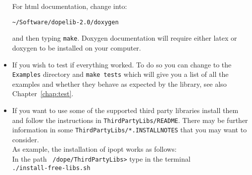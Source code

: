 \begin{itemize}
{\begin{lstlisting}
\end{lstlisting}
}
For html documentation, change into:
\begin{lstlisting}
~/Software/dopelib-2.0/doxygen
\end{lstlisting}
and then typing \texttt{make}. Doxygen documentation
will require either 
latex or doxygen to be installed on your computer.
\item If you wish to test if everything worked. To do so you can 
change to the \texttt{Examples} directory and \texttt{make tests} which will give you a 
list of all the examples and whether they behave as expected by the library, see also 
Chapter~\ref{chap:test}.
\item  If you want to use some of the supported third party libraries install them and follow 
 the instructions in \texttt{ThirdPartyLibs/README}. There may be further information 
 in some \texttt{ThirdPartyLibs/*.INSTALLNOTES} that you may want to
 consider.\\[3mm]
 As example, the installation of ipopt works as follows:\\
In the path \texttt{~/dope/ThirdPartyLibs>} type in the terminal\\
\texttt{./install-free-libs.sh}


\end{itemize}
